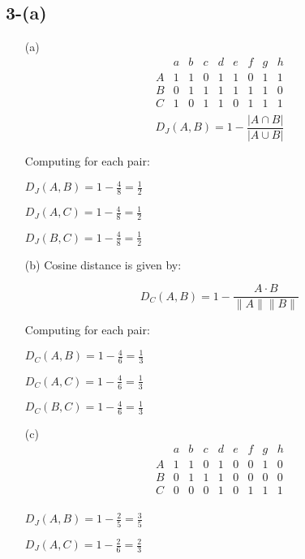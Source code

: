 \documentclass{article}
\begin{document}
\subsection*{3-(a)}
\begin{enumerate}
    \item[(a)]
            \[
            \begin{array}{c|cccccccc}
            & a & b & c & d & e & f & g & h \\
            \hline
            A & 1 & 1 & 0 & 1 & 1 & 0 & 1 & 1 \\
            B & 0 & 1 & 1 & 1 & 1 & 1 & 1 & 0 \\
            C & 1 & 0 & 1 & 1 & 0 & 1 & 1 & 1 \\
            \end{array}
            \]
            \[
        D_J(A,B) = 1 - \frac{|A \cap B|}{|A \cup B|}
        \]

        Computing for each pair:

        \(D_J(A,B) = 1 - \frac{4}{8} = \frac{1}{2}\)

        \(D_J(A,C) = 1 - \frac{4}{8} = \frac{1}{2}\)

        \(D_J(B,C) = 1 - \frac{4}{8} = \frac{1}{2}\)
    \item[(b)]
        Cosine distance is given by:

        \[
        D_C(A,B) = 1 - \frac{A \cdot B}{\|A\| \|B\|}
        \]

        Computing for each pair:

        \(D_C(A,B) = 1 - \frac{4}{6} = \frac{1}{3}\)

        \(D_C(A,C) = 1 - \frac{4}{6} = \frac{1}{3}\)

        \(D_C(B,C) = 1 - \frac{4}{6} = \frac{1}{3}\)
    \item[(c)]
        \[
        \begin{array}{c|cccccccc}
        & a & b & c & d & e & f & g & h \\
        \hline
        A & 1 & 1 & 0 & 1 & 0 & 0 & 1 & 0 \\
        B & 0 & 1 & 1 & 1 & 0 & 0 & 0 & 0 \\
        C & 0 & 0 & 0 & 1 & 0 & 1 & 1 & 1 \\
        \end{array}
        \]
    
        \(D_J(A,B) = 1 - \frac{2}{5} = \frac{3}{5}\)

        \(D_J(A,C) = 1 - \frac{2}{6} = \frac{2}{3}\)


\end{enumerate}
\end{document}
